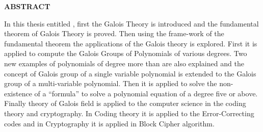 \begin{center}
{\Large{\bfseries ABSTRACT}}
\end{center}
\vspace{0.7cm}

In this thesis entitled \textcolor{blue}{\thetitle}, first the Galois Theory is introduced and the fundamental theorem of Galois Theory is proved. Then using the frame-work of the fundamental theorem the applications of the Galois theory is explored. First it is applied to compute the Galois Groups of Polynomials of various degrees. Two new examples of polynomials of degree more than are also explained and the concept of Galois group of a single variable polynomial is extended to the Galois group of a multi-variable polynomial. Then it is applied to solve the non-existence of a ``formula'' to solve a polynomial equation of a degree five or above. Finally  theory of Galois field is applied to the computer science in the coding theory and cryptography. In Coding theory it is applied to the Error-Correcting codes and in Cryptography it is applied in Block Cipher algorithm.
\clearpage
